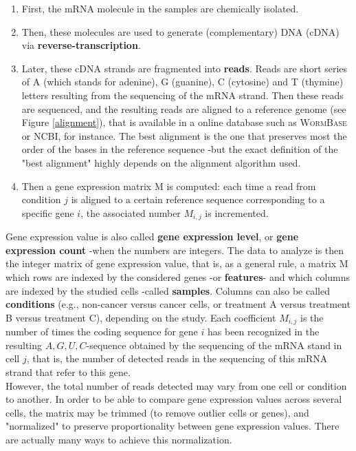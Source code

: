 \documentclass{report}
\begin{document}
\begin{enumerate}
\item First, the mRNA molecule in the samples are chemically isolated. 
\item Then, these molecules are used to generate (complementary) DNA (cDNA) via \textbf{reverse-transcription}. 
\item Later, these cDNA strands are fragmented into \textbf{reads}. Reads are short series of A (which stands for adenine), G (guanine), C (cytosine) and T (thymine) letters resulting from the sequencing of the mRNA strand. Then these reads are sequenced, and the resulting reads are aligned to a reference genome (see Figure \ref{alignment}), that is available in a online database such as \textsc{WormBase}\cite{stein2001wormbase} or \textsc{NCBI}\cite{ncbi}, for instance. The best alignment is the one that preserves most the order of the bases in the reference sequence -but the exact definition of the "best alignment" highly depends on the alignment algorithm used. 
\item Then a gene expression matrix M is computed: each time a read from condition $j$ is aligned to a certain reference sequence corresponding to a specific gene $i$, the associated number $M_{i,j}$ is incremented.
\end{enumerate}

Gene expression value is also called \textbf{gene expression level}, or \textbf{gene expression count} -when the numbers are integers. The data to analyze is then the integer matrix of gene expression value, that is, as a general rule, a matrix M which rows are indexed by the considered genes -or \textbf{features}- and which columns are indexed by the studied cells -called \textbf{samples}. Columns can also be called \textbf{conditions} (e.g., non-cancer versus cancer cells, or treatment A versus treatment B versus treatment C), depending on the study. Each coefficient $M_{i,j}$ is the number of times the coding sequence for gene $i$ has been recognized in the resulting ${A, G, U, C}$-sequence obtained by the sequencing of the mRNA stand in cell $j$, that is, the number of detected reads in the sequencing of this mRNA strand that refer to this gene.\\

However, the total number of reads detected may vary from one cell or condition to another. In order to be able to compare gene expression values across several cells, the matrix may be trimmed (to remove outlier cells or genes), and "normalized" to preserve proportionality between gene expression values. There are actually many ways to achieve this normalization\cite{love2014moderated}\cite{chen2014differential}.
\end{document}
